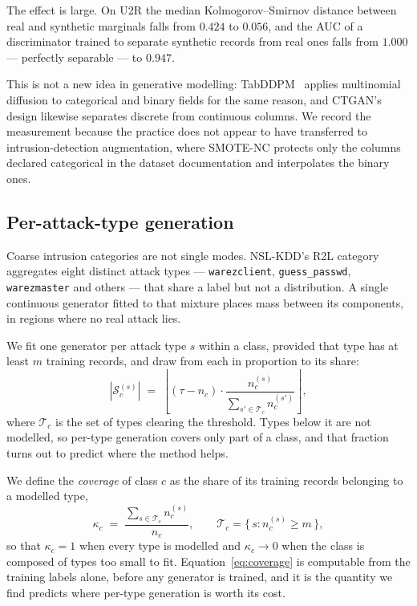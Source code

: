 \documentclass[11pt]{article}
\begin{document}
The effect is large. On U2R the median Kolmogorov--Smirnov distance between real and
synthetic marginals falls from $0.424$ to $0.056$, and the AUC of a discriminator
trained to separate synthetic records from real ones falls from $1.000$ --- perfectly
separable --- to $0.947$.

This is not a new idea in generative modelling: TabDDPM~\cite{kotelnikov2023tabddpm}
applies multinomial diffusion to categorical and binary fields for the same reason,
and CTGAN's design likewise separates discrete from continuous columns. We record
the measurement because the practice does not appear to have transferred to
intrusion-detection augmentation, where SMOTE-NC protects only the columns declared
categorical in the dataset documentation and interpolates the binary ones.

\subsection*{Per-attack-type generation}

Coarse intrusion categories are not single modes. NSL-KDD's R2L category aggregates
eight distinct attack types --- \texttt{warezclient}, \texttt{guess\_passwd},
\texttt{warezmaster} and others --- that share a label but not a distribution. A
single continuous generator fitted to that mixture places mass between its
components, in regions where no real attack lies.

We fit one generator per attack type $s$ within a class, provided that type has at
least $m$ training records, and draw from each in proportion to its share:
\begin{equation}
|\mathcal{S}_c^{(s)}| \;=\;
\left\lfloor (\tau - n_c) \cdot \frac{n_{c}^{(s)}}{\sum_{s' \in \mathcal{T}_c} n_c^{(s')}}
\right\rfloor ,
\end{equation}
where $\mathcal{T}_c$ is the set of types clearing the threshold. Types below it are
not modelled, so per-type generation covers only part of a class, and that fraction
turns out to predict where the method helps.

We define the \emph{coverage} of class $c$ as the share of its training records
belonging to a modelled type,
\begin{equation}
\kappa_c \;=\;
\frac{\sum_{s \in \mathcal{T}_c} n_c^{(s)}}{n_c},
\qquad
\mathcal{T}_c = \{\, s : n_c^{(s)} \geq m \,\},
\label{eq:coverage}
\end{equation}
so that $\kappa_c = 1$ when every type is modelled and $\kappa_c \to 0$ when the
class is composed of types too small to fit. Equation~\eqref{eq:coverage} is
computable from the training labels alone, before any generator is trained, and it
is the quantity we find predicts where per-type generation is worth its cost.
\end{document}

